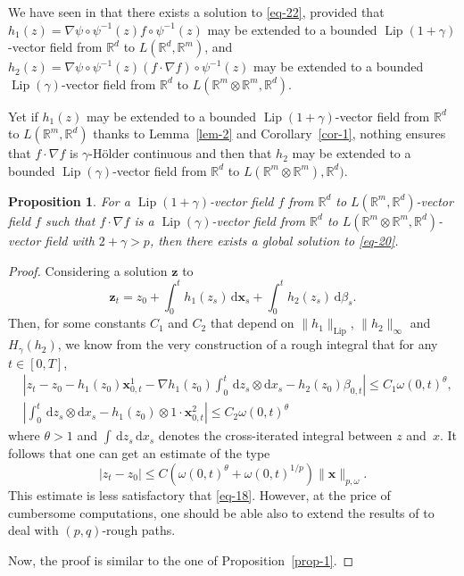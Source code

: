 \documentclass[a4paper,12pt]{article}
\newtheorem{proposition}[theorem]{Proposition}
\theoremstyle{definition}
\newcommand{\vd}{\,\mathrm{d}}
\newcommand{\dd}{\mathrm{d}}
\newcommand{\bx}{\mathbf{x}}
\newcommand{\bz}{\mathbf{z}}
\newcommand{\RR}{\mathbb{R}}
\DeclareMathOperator{\Lip}{Lip}
\begin{document}
We have seen in \cite{lejay-victoir06a}
that there exists a solution to \eqref{eq-22}, 
provided that $h_1(z)=\nabla\psi\circ\psi^{-1}(z)f\circ\psi^{-1}(z)$ may be extended to  
a bounded $\Lip(1+\gamma)$-vector field from $\RR^d$ to $L(\RR^d,\RR^m)$, and 
$h_2(z)=\nabla \psi\circ \psi^{-1}(z)
(f\cdot\nabla f)\circ\psi^{-1}(z)$
may be extended to a bounded $\Lip(\gamma)$-vector field from $\RR^d$ to $L(\RR^m\otimes\RR^m,\RR^d)$.

Yet if $h_1(z)$ may be extended to a bounded $\Lip(1+\gamma)$-vector field from $\RR^d$ to $L(\RR^m,\RR^d)$
thanks to Lemma~\ref{lem-2} and Corollary~\ref{cor-1},
nothing ensures that $f\cdot\nabla f$ is $\gamma$-Hölder continuous
and then that $h_2$ may be extended to a bounded $\Lip(\gamma)$-vector field
from $\RR^d$ to $L(\RR^m\otimes\RR^m),\RR^d)$.

\begin{proposition}
For a $\Lip(1+\gamma)$-vector field $f$ from $\RR^d$ to $L(\RR^m,\RR^d)$-vector field $f$
such that $f\cdot\nabla f$ is a $\Lip(\gamma)$-vector field from $\RR^d$
to $L(\RR^m\otimes\RR^m,\RR^d)$-vector field
with $2+\gamma>p$, then there exists a global solution to \eqref{eq-20}.
\end{proposition}

\begin{proof}
Considering a solution $\bz$ to 
\begin{equation*}
\bz_t=z_0+\int_0^t h_1(z_s)\vd \bx_s+\int_0^t h_2(z_s)\vd\beta_s.
\end{equation*}
Then, for some constants $C_1$ and $C_2$ that depend on 
$\|h_1\|_{\Lip}$, 
$\|h_2\|_{\infty}$ and $H_\gamma(h_2)$, 
we know from the very
construction of a rough integral that for any $t\in[0,T]$, 
\begin{align*}
&\left|
z_t-z_0-h_1(z_0)\bx^1_{0,t}-\nabla h_1(z_0)\int_0^t \vd z_s\otimes\dd x_s
-h_2(z_0)\beta_{0,t}
\right|\leq C_1\omega(0,t)^{\theta},\\
&\left|
\int_0^t \vd z_s\otimes\dd x_s-h_1(z_0)\otimes 1\cdot \bx^2_{0,t}
\right|\leq C_2\omega(0,t)^\theta
\end{align*}
where $\theta>1$ and $\int \vd z_s\vd x_s$ denotes
the cross-iterated integral between $z$ and~$x$.
It follows that one can get an estimate of the type
\begin{equation*}
|z_t-z_0|\leq C(\omega(0,t)^\theta+\omega(0,t)^{1/p})\|\bx\|_{p,\omega}.
\end{equation*}
This estimate is less satisfactory that \eqref{eq-18}.
However, at the price of cumbersome computations, one should 
be able also to extend the results of \cite{lejay09a}
to deal with $(p,q)$-rough paths.

Now, the proof is similar to the one of Proposition~\ref{prop-1}.
\end{proof}
\end{document}
